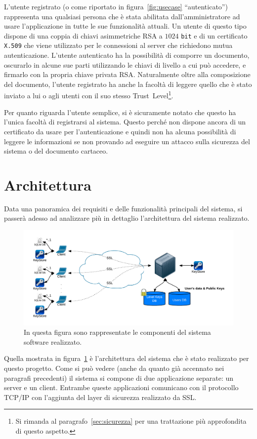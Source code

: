 L'utente registrato (o come riportato in figura~\ref{fig:usecase} ``autenticato'') rappresenta una qualsiasi persona che è stata abilitata dall'amministratore ad usare l'applicazione in tutte le sue funzionalità attuali. Un utente di questo tipo dispone di una coppia di chiavi asimmetriche RSA a $1024$ \texttt{bit} e di un certificato \texttt{X.509} che viene utilizzato per le connessioni al server che richiedono mutua autenticazione. L'utente autenticato ha la possibilità di comporre un documento, oscurarlo in alcune sue parti utilizzando le chiavi di livello a cui può accedere, e firmarlo con la propria chiave privata RSA. 
Naturalmente oltre alla composizione del documento, l'utente registrato ha anche la facoltà di leggere quello che è stato inviato a lui o agli utenti con il suo stesso Trust~Level\footnote{Si rimanda al paragrafo~\ref{sec:sicurezza} per una trattazione più approfondita di questo aspetto.}.

Per quanto riguarda l'utente semplice, si è sicuramente notato che questo ha l'unica facoltà di registrarsi al sistema. Questo perché non dispone ancora di un certificato da usare per l'autenticazione e quindi non ha alcuna possibilità di leggere le informazioni se non provando ad eseguire un attacco sulla sicurezza del sistema o del documento cartaceo.

\section{Architettura}
	\label{sec:architettura}
Data una panoramica dei requisiti e delle funzionalità principali del sistema, si passerà adesso ad analizzare più in dettaglio l'architettura del sistema realizzato.
	\begin{center}	
		\begin{figure}[H]
		\centering
		\includegraphics[scale=0.9]{Immagini/architettura}
		\caption[Architettura del sistema]{In questa figura sono rappresentate le componenti del sistema software realizzato.}
		\label{fig:architettura}
		\end{figure}
	\end{center}
Quella mostrata in figura~\ref{fig:architettura} è l'architettura del sistema che è stato realizzato per questo progetto.
Come si può vedere (anche da quanto già accennato nei paragrafi precedenti) il sistema si compone di due applicazione separate: un server e un client.
Entrambe queste applicazioni comunicano con il protocollo TCP/IP con l'aggiunta del layer di sicurezza realizzato da SSL.

